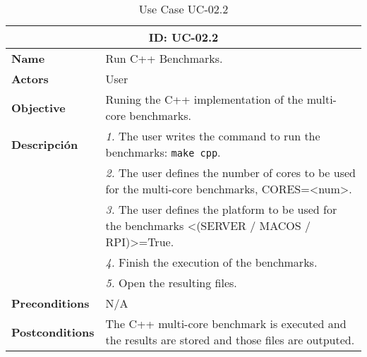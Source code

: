 \begin{table}[H]
    \centering
    \begin{tabular}{l p{10cm}}
        \toprule
        \multicolumn{2}{c}{\textbf{ID: UC-02.2}} \\
        \toprule
        \textbf{Name}                         &  Run C++ Benchmarks. \\
        \textbf{Actors}                       &  User \\
        \textbf{Objective}                    &  Runing the C++ implementation of the multi-core benchmarks. \\
        \multirow{1}{*}{\textbf{Descripción}} & \textsl{1.} The user writes the command to run the benchmarks: \texttt{make cpp}.\\
                                              & \textsl{2.} The user defines the number of cores to be used for the multi-core benchmarks, CORES=<num>.\\
                                              & \textsl{3.} The user defines the platform to be used for the benchmarks <(SERVER / MACOS / RPI)>=True.\\
                                              & \textsl{4.} Finish the execution of the benchmarks.\\
                                              & \textsl{5.} Open the resulting files.\\ 
        \textbf{Preconditions}                &  N/A \\
        \textbf{Postconditions}               &  The C++ multi-core benchmark is executed and the results are stored and those files are outputed. \\
    \end{tabular}
    \caption{Use Case UC-02.2}
    \label{tab:uc-02.2}
\end{table}




